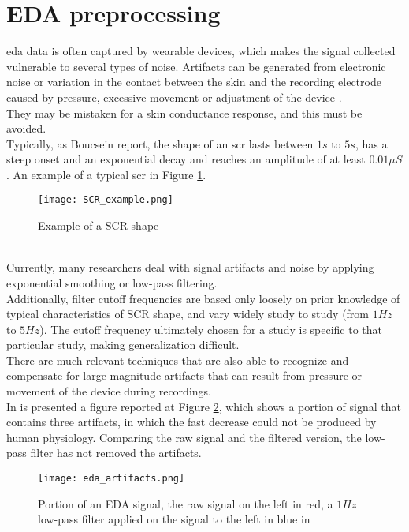 \section{EDA preprocessing}
\gls{eda} data is often captured by wearable devices, which makes the signal collected vulnerable to several types of noise. Artifacts can be generated from electronic noise or variation in the contact between the skin and the recording electrode caused by pressure, excessive movement or adjustment of the device \cite{taylor2015automatic}.
\\
They may be mistaken for a skin conductance response, and this must be avoided.
\\ \indent
Typically, as Boucsein \cite{boucsein2012electrodermal} report, the shape of an \gls{scr} lasts between $1s$ to $5s$, has a steep onset and an exponential decay and reaches an amplitude of at least $0.01\mu S$. An example of a typical \gls{scr} in Figure \ref{fig:SCR_example}.
\begin{figure}[h]
    \centering
    \texttt{[image: SCR\_example.png]} 
	\caption{Example of a SCR shape}
    \label{fig:SCR_example}
\end{figure}
\\
Currently, many researchers deal with signal artifacts and noise by applying exponential smoothing or low-pass filtering.
\\
Additionally, filter cutoff frequencies are based only loosely on prior knowledge of typical characteristics of SCR shape, and vary widely study to study (from $1Hz$ to $5Hz$). The cutoff frequency ultimately chosen for a study is specific to that particular study, making generalization difficult.
\\ \indent
There are much relevant techniques that are also able to recognize and compensate for large-magnitude artifacts that can result from pressure or movement of the device during recordings.
\\
In \cite{taylor2015automatic} is presented a figure reported at Figure \ref{fig:eda_artifacts}, which shows a portion of signal that contains three artifacts, in which the fast decrease could not be produced by human physiology. Comparing the raw signal and the filtered version, the low-pass filter has not removed the artifacts.
\begin{figure}[h]
    \centering
    \texttt{[image: eda\_artifacts.png]} 
	\caption{Portion of an EDA signal, the raw signal on the left in red, a $1Hz$ low-pass filter applied on the signal to the left in blue in \cite{taylor2015automatic} }
    \label{fig:eda_artifacts}
\end{figure}
